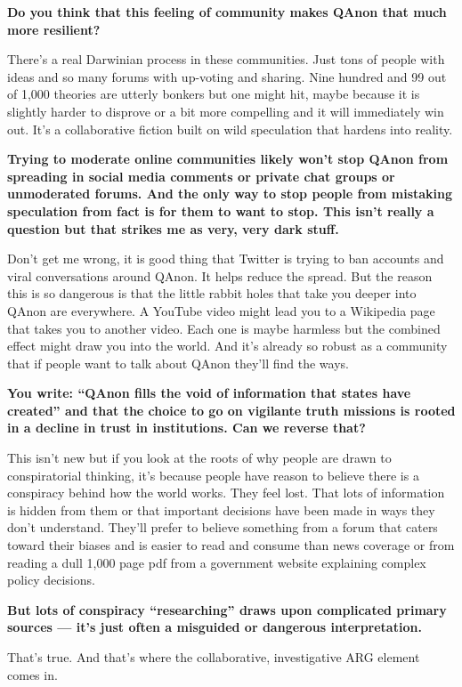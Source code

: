 \textbf{Do you think that this feeling of community makes QAnon that
much more resilient?}

There's a real Darwinian process in these communities. Just tons of
people with ideas and so many forums with up-voting and sharing. Nine
hundred and 99 out of 1,000 theories are utterly bonkers but one might
hit, maybe because it is slightly harder to disprove or a bit more
compelling and it will immediately win out. It's a collaborative fiction
built on wild speculation that hardens into reality.

\textbf{Trying to moderate online communities likely won't stop QAnon
from spreading in social media comments or private chat groups or
unmoderated forums. And the only way to stop people from mistaking
speculation from fact is for them to want to stop. This isn't really a
question but that strikes me as very, very dark stuff.}

Don't get me wrong, it is good thing that Twitter is trying to ban
accounts and viral conversations around QAnon. It helps reduce the
spread. But the reason this is so dangerous is that the little rabbit
holes that take you deeper into QAnon are everywhere. A YouTube video
might lead you to a Wikipedia page that takes you to another video. Each
one is maybe harmless but the combined effect might draw you into the
world. And it's already so robust as a community that if people want to
talk about QAnon they'll find the ways.

\textbf{You write: ``QAnon fills the void of information that states
have created'' and that the choice to go on vigilante truth missions is
rooted in a decline in trust in institutions. Can we reverse that?}

This isn't new but if you look at the roots of why people are drawn to
conspiratorial thinking, it's because people have reason to believe
there is a conspiracy behind how the world works. They feel lost. That
lots of information is hidden from them or that important decisions have
been made in ways they don't understand. They'll prefer to believe
something from a forum that caters toward their biases and is easier to
read and consume than news coverage or from reading a dull 1,000 page
pdf from a government website explaining complex policy decisions.

\textbf{But lots of conspiracy ``researching'' draws upon complicated
primary sources --- it's just often a misguided or dangerous
interpretation.}

That's true. And that's where the collaborative, investigative ARG
element comes in.

